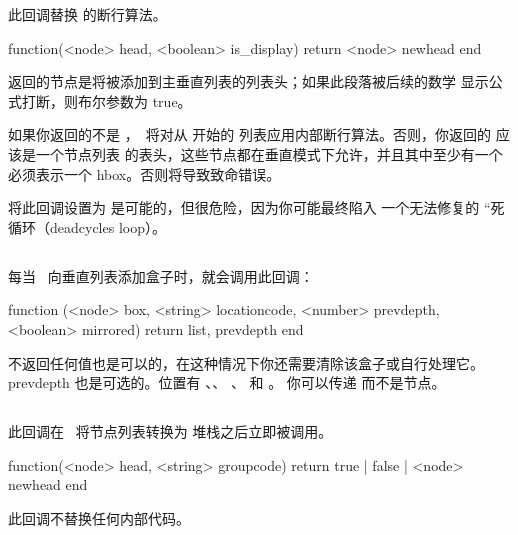 
此回调替换 \LUATEX 的断行算法。

\begin{typing}
function(<node> head, <boolean> is_display)
    return <node> newhead
end
\end{typing}

返回的节点是将被添加到主垂直列表的列表头；如果此段落被后续的数学
显示公式打断，则布尔参数为 true。

如果你返回的不是 ，\LUATEX\ 将对从  开始的
列表应用内部断行算法。否则，你返回的  应该是一个节点列表
的表头，这些节点都在垂直模式下允许，并且其中至少有一个必须表示一个
hbox。否则将导致致命错误。

将此回调设置为  是可能的，但很危险，因为你可能最终陷入
一个无法修复的 ``死循环（deadcycles loop）。

\subsection{}


每当 \LUATEX\ 向垂直列表添加盒子时，就会调用此回调：

\begin{typing}
function (<node> box, <string> locationcode, <number> prevdepth, <boolean> mirrored)
    return list, prevdepth
end
\end{typing}

不返回任何值也是可以的，在这种情况下你还需要清除该盒子或自行处理它。
prevdepth 也是可选的。位置有 、、
、 和 。
你可以传递  而不是节点。

\subsection{}


此回调在 \LUATEX\ 将节点列表转换为  堆栈之后立即被调用。

\begin{typing}
function(<node> head, <string> groupcode)
    return true | false | <node> newhead
end
\end{typing}

此回调不替换任何内部代码。

